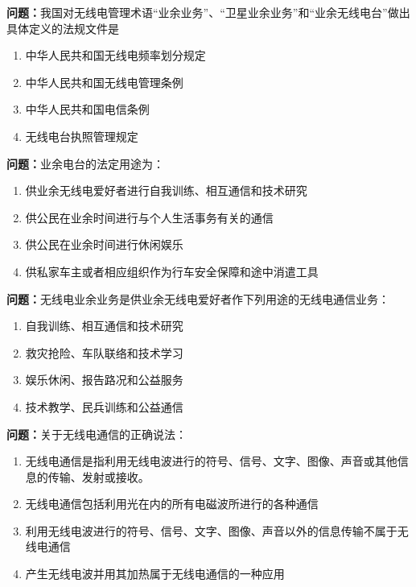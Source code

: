 \noindent\textbf{问题：}我国对无线电管理术语“业余业务”、“卫星业余业务”和“业余无线电台”做出具体定义的法规文件是
\begin{enumerate}[label=\Alph*), leftmargin=3em]
\item 中华人民共和国无线电频率划分规定
\item 中华人民共和国无线电管理条例
\item 中华人民共和国电信条例
\item 无线电台执照管理规定
\end{enumerate}

\bigskip


\noindent\textbf{问题：}业余电台的法定用途为：
\begin{enumerate}[label=\Alph*), leftmargin=3em]
\item 供业余无线电爱好者进行自我训练、相互通信和技术研究
\item 供公民在业余时间进行与个人生活事务有关的通信
\item 供公民在业余时间进行休闲娱乐
\item 供私家车主或者相应组织作为行车安全保障和途中消遣工具
\end{enumerate}

\bigskip


\noindent\textbf{问题：}无线电业余业务是供业余无线电爱好者作下列用途的无线电通信业务：
\begin{enumerate}[label=\Alph*), leftmargin=3em]
\item 自我训练、相互通信和技术研究
\item 救灾抢险、车队联络和技术学习
\item 娱乐休闲、报告路况和公益服务
\item 技术教学、民兵训练和公益通信
\end{enumerate}

\bigskip


\noindent\textbf{问题：}关于无线电通信的正确说法：
\begin{enumerate}[label=\Alph*), leftmargin=3em]
\item 无线电通信是指利用无线电波进行的符号、信号、文字、图像、声音或其他信息的传输、发射或接收。
\item 无线电通信包括利用光在内的所有电磁波所进行的各种通信
\item 利用无线电波进行的符号、信号、文字、图像、声音以外的信息传输不属于无线电通信
\item 产生无线电波并用其加热属于无线电通信的一种应用
\end{enumerate}

\bigskip


